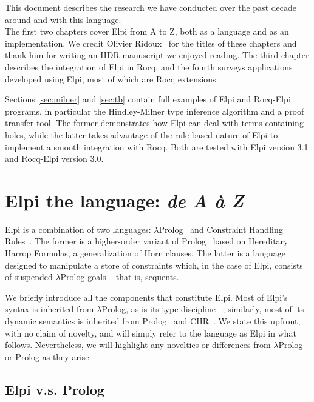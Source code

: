 \documentclass[a4paper, 11pt]{book}
\begin{document}
This document describes the research we have conducted over the past decade
around and with this language.\\

The first two chapters cover Elpi from A to Z, both as a language and as an
implementation. We credit Olivier Ridoux~\cite{ridoux1998lambda} for the titles of
these chapters and thank him for writing an HDR manuscript we enjoyed reading.
The third chapter describes the integration of Elpi in Rocq, and the fourth
surveys applications developed using Elpi, most of which are Rocq extensions.

Sections \ref{sec:milner} and \ref{sec:tb} contain full examples of Elpi and
Rocq-Elpi programs, in particular the Hindley-Milner type inference
algorithm and a proof transfer tool. The former demonstrates how Elpi
can deal with terms containing holes, while the latter takes advantage of
the rule-based nature of Elpi to implement a smooth integration with Rocq.
Both are tested with Elpi version 3.1 and Rocq-Elpi version 3.0.

\chapter{Elpi the language: \emph{de A \`a Z}}


Elpi is a combination of two languages: $\lambda$Prolog~\cite{10.1093/logcom/1.4.497,Miller_Nadathur_2012}
and Constraint Handling Rules~\cite{FRUHWIRTH199895,chr}. The former is a
higher-order variant of Prolog~\cite{prolog0,prolog} based on Hereditary
Harrop Formulas, a generalization of Horn clauses. The latter is a language
designed to manipulate a store of constraints which, in the case of Elpi,
consists of suspended $\lambda$Prolog goals -- that is, sequents.

We briefly introduce all the components that constitute Elpi. Most of Elpi's
syntax is inherited from $\lambda$Prolog, as is its type discipline
~\cite{Miller_Nadathur_2012}; similarly, most of its dynamic semantics is
inherited from Prolog~\cite{1989Vink} and CHR~\cite{10.1007/978-3-540-27775-0_7}.
We state this upfront, with no claim of novelty, and
will simply refer to the language as Elpi in what follows. Nevertheless, we
will highlight any novelties or differences from $\lambda$Prolog or Prolog as
they arise.

\section{Elpi v.s. Prolog}
\end{document}

